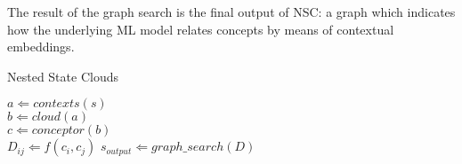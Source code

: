 The result of the graph search is the final output of NSC: a graph which indicates how the underlying ML model relates concepts by means of contextual embeddings.

\begin{algorithm}[!tbp] 
    \caption{Nested State Clouds}
    \label{alg:gs}
    \begin{algorithmic}
            \STATE $a \Leftarrow contexts(s)$ \\
            \STATE $b \Leftarrow cloud(a)$ \\
            \STATE $c \Leftarrow conceptor(b)$ \\
        \ENDFOR
                \STATE $D_{ij} \Leftarrow f(c_i, c_j)$
            \ENDFOR
        \ENDFOR
        \STATE $s_{output} \Leftarrow graph\_search(D)$
    \end{algorithmic}
\end{algorithm}